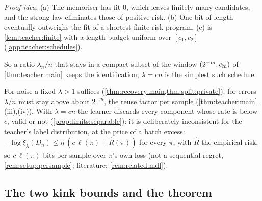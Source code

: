 \emph{Proof idea.} (a) The memoriser has fit $0$, which leaves finitely many candidates, and the strong law eliminates those of positive risk. (b) One bit of length eventually outweighs the fit of a shortest finite-risk program. (c) is \cref{lem:teacher:finite} with a length budget uniform over $[c_1,c_2]$ (\cref{app:teacher:schedules}).

So a ratio $\lambda_n/n$ that stays in a compact subset of the window $(2^{-m},c_{\rm hi})$ of \cref{thm:teacher:main} keeps the identification; $\lambda=cn$ is the simplest such schedule.

\begin{remark}\label{rem:limits:schedule}
For noise a fixed $\lambda>1$ suffices (\cref{thm:recovery:main,thm:split:private}); for errors $\lambda/n$ must stay above about $2^{-m}$, the reuse factor per sample (\cref{thm:teacher:main}(iii),(iv)). With $\lambda=cn$ the learner discards every component whose rate is below $c$, valid or not (\cref{prop:limits:separable}): it is deliberately inconsistent for the teacher's label distribution, at the price of a batch excess: $-\log\xi_\lambda(D_n)\le n\,(c\,\ell(\pi)+\hat R(\pi))$ for every $\pi$, with $\hat R$ the empirical risk, so $c\,\ell(\pi)$ bits per sample over $\pi$'s own loss (not a sequential regret, \cref{rem:setup:persample}; literature: \cref{rem:related:mdl}).
\end{remark}

\subsection{The two kink bounds and the theorem}\label{sec:teacher:theorem}

